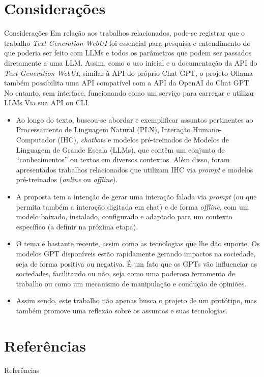 \documentclass{beamer}
\begin{document}
\section{Considerações}
\begin{frame}[allowframebreaks]{Considerações}
    Em relação aos trabalhos relacionados, pode-se registrar que o trabalho \textit{Text-Generation-WebUI} \cite{text-generation-webui} foi essencial para pesquisa e entendimento do que poderia ser feito com LLMs e todos os parâmetros que podem ser passados diretamente a uma LLM. Assim, como o uso inicial e a documentação da API do \textit{Text-Generation-WebUI}, similar à API do próprio Chat GPT, o projeto Ollama também possibilita uma API compatível com a API da OpenAI do Chat GPT. No entanto, sem interface, funcionando como um serviço para carregar e utilizar LLMs Via sua API ou CLI.

\begin{itemize}
    \item Ao longo do texto, buscou-se abordar e exemplificar assuntos pertinentes ao Processamento de Linguagem Natural (PLN), Interação Humano-Computador (IHC), \textit{chatbots} e modelos pré-treinados de Modelos de Linguagem de Grande Escala (LLMs), que contêm um conjunto de ``conhecimentos'' ou textos em diversos contextos. Além disso, foram apresentados trabalhos relacionados que utilizam IHC via \textit{prompt} e modelos pré-treinados (\textit{online} ou \textit{offline}).

    \item A proposta tem a intenção de gerar uma interação falada via \textit{prompt} (ou que permita também a interação digitada em chat) e de forma \textit{offline}, com um modelo baixado, instalado, configurado e adaptado para um contexto específico (a definir na próxima etapa).
    \item O tema é bastante recente, assim como as tecnologias que lhe dão suporte. Os modelos GPT disponíveis estão rapidamente gerando impactos na sociedade, seja de forma positiva ou negativa. É um fato que os GPTs vão influenciar as sociedades, facilitando ou não, seja como uma poderosa ferramenta de trabalho ou como um mecanismo de manipulação e condução de opiniões.
    \item Assim sendo, este trabalho não apenas busca o projeto de um protótipo, mas também promove uma reflexão sobre os assuntos e suas tecnologias.
\end{itemize}

\end{frame}

\section{Referências}  
\begin{frame}[allowframebreaks]{Referências}
    
    
\end{frame}


\begin{frame}
  \titlepage
\end{frame}
\end{document}
